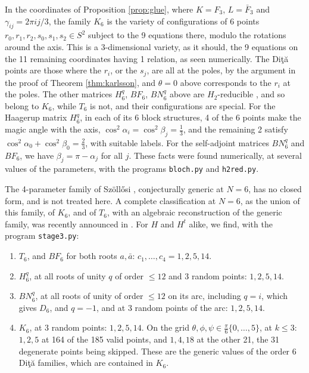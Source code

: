 \documentclass[11pt]{amsart}
\begin{document}
\noindent In the coordinates of Proposition \ref{prop:glue}, where $K=F_3$, $L=\bar{F}_3$ and $\gamma_{ij}=2\pi ij/3$, the family $K_6$ is the variety of configurations of 6 points $r_0,r_1,r_2,s_0,s_1,s_2\in S^2$ subject to the 9 equations there, modulo the rotations around the axis. This is a 3-dimensional variety, as it should, the 9 equations on the 11 remaining coordinates having 1 relation, as seen numerically. The Di\c t\u a points are those where the $r_i$, or the $s_j$, are all at the poles, by the argument in the proof of Theorem \ref{thm:karlsson}, and $\theta=0$ above corresponds to the $r_i$ at the poles. The other matrices $H_6^q$, $BF_6$, $BN_6^q$ above are $H_2$-reducible \cite{ka2}, and so belong to $K_6$, while $T_6$ is not, and their configurations are special. For the Haagerup matrix $H_6^q$, in each of its 6 block structures, 4 of the 6 points make the magic angle with the axis, $\cos^2\alpha_i=\cos^2\beta_j=\frac{1}{3}$, and the remaining 2 satisfy $\cos^2\alpha_0+\cos^2\beta_0=\frac{2}{3}$, with suitable labels. For the self-adjoint matrices $BN_6^q$ and $BF_6$, we have $\beta_j=\pi-\alpha_j$ for all $j$. These facts were found numerically, at several values of the parameters, with the programs \texttt{bloch.py} and \texttt{h2red.py}.

\noindent The 4-parameter family of Sz\"oll\H{o}si \cite{sz4}, conjecturally generic at $N=6$, has no closed form, and is not treated here. A complete classification at $N=6$, as the union of this family, of $K_6$, and of $T_6$, with an algebraic reconstruction of the generic family, was recently announced in \cite{cwt}. For $H$ and $H^t$ alike, we find, with the program \texttt{stage3.py}:
\begin{enumerate}
\item $T_6$, and $BF_6$ for both roots $a,\bar{a}$: $c_1,\ldots,c_4=1,2,5,14$.

\item $H_6^q$, at all roots of unity $q$ of order $\leq12$ and 3 random points: $1,2,5,14$.

\item $BN_6^q$, at all roots of unity of order $\leq12$ on its arc, including $q=i$, which gives $D_6$, and $q=-1$, and at 3 random points of the arc: $1,2,5,14$.

\item $K_6$, at 3 random points: $1,2,5,14$. On the grid $\theta,\phi,\psi\in\frac{\pi}{6}\{0,\ldots,5\}$, at $k\leq3$: $1,2,5$ at 164 of the 185 valid points, and $1,4,18$ at the other 21, the 31 degenerate points being skipped. These are the generic values of the order 6 Di\c t\u a families, which are contained in $K_6$.
\end{enumerate}
\end{document}
